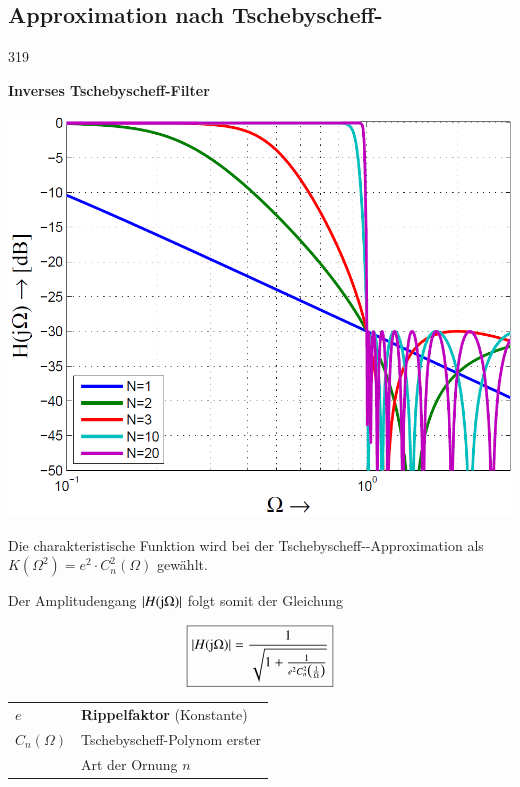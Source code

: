 \subsection{Approximation nach Tschebyscheff-}{319}

\begin{minipage}[c]{0.45\columnwidth}
    \textbf{Inverses Tschebyscheff-Filter}

    \includegraphics[width=\columnwidth]{images/filter_tschebyscheff_invers_amplitudengang.png}
\end{minipage}
\hfill
\begin{minipage}[c]{0.48\columnwidth}
    Die charakteristische Funktion wird bei der Tschebyscheff--Approximation als\\
    $K(\Omega^2) = e^2 \cdot C_n^2(\Omega)$ gewählt.

    Der Amplitudengang $|H(\mathrm{j} \Omega)|$ folgt somit der Gleichung

    $$ \boxed{ |H(\mathrm{j} \Omega)| = \frac{1}{\sqrt{1 + \frac{1}{e^2 C_n^2  \big(\frac{1}{\Omega} \big) }}} } $$

    \begin{tabular}{ll@{}}
        $e$             & \textbf{Rippelfaktor} (Konstante) \\
        $C_n(\Omega)$   & Tschebyscheff-Polynom erster\\
                        & Art der Ornung $n$
    \end{tabular}
\end{minipage}


